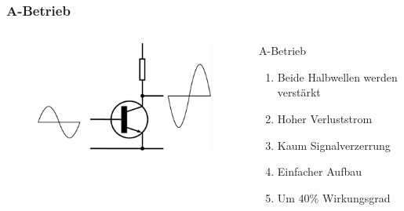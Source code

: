 \begin{frame}
  \frametitle{A-Betrieb}
  \begin{columns}[c]
    \begin{center}
      \begin{figure}
        \includegraphics[width=1\textwidth,height=.8\textheight,keepaspectratio]{a07/Electronic_Amplifier_Class_A.png}
      \end{figure}
    \end{center}
     \large
    \begin{block}{A-Betrieb}
      \begin{enumerate}
        \item Beide Halbwellen werden verstärkt
        \item Hoher Verluststrom
        \item Kaum Signalverzerrung
        \item Einfacher Aufbau
        \item Um $40\%$ Wirkungsgrad
      \end{enumerate}
    \end{block}
  \end{columns}
\end{frame}

